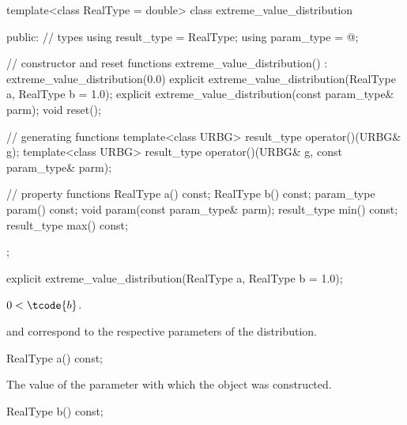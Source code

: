 %
%
\begin{codeblock}
template<class RealType = double>
  class extreme_value_distribution {
  public:
    // types
    using result_type = RealType;
    using param_type  = @\unspec@;

    // constructor and reset functions
    extreme_value_distribution() : extreme_value_distribution(0.0) {}
    explicit extreme_value_distribution(RealType a, RealType b = 1.0);
    explicit extreme_value_distribution(const param_type& parm);
    void reset();

    // generating functions
    template<class URBG>
      result_type operator()(URBG& g);
    template<class URBG>
      result_type operator()(URBG& g, const param_type& parm);

    // property functions
    RealType a() const;
    RealType b() const;
    param_type param() const;
    void param(const param_type& parm);
    result_type min() const;
    result_type max() const;
  };
\end{codeblock}

\begin{indexed}{}
\begin{itemdecl}
explicit extreme_value_distribution(RealType a, RealType b = 1.0);
\end{itemdecl}
\end{indexed}

\begin{itemdescr}
\pnum
\expects
$0 < \tcode{b}$.

\pnum
\remarks
{} and 
correspond to the respective parameters of the distribution.
\end{itemdescr}

\begin{indexed}{}
\begin{itemdecl}
RealType a() const;
\end{itemdecl}
\end{indexed}

\begin{itemdescr}
\pnum
\returns
The value of the  parameter
 with which the object was constructed.
\end{itemdescr}

\begin{indexed}{}
\begin{itemdecl}
RealType b() const;
\end{itemdecl}
\end{indexed}

